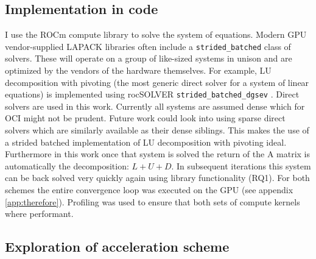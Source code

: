 \subsection{Implementation in code}

I use the ROCm compute library to solve the system of equations.
Modern GPU vendor-supplied LAPACK libraries often include a \texttt{strided\_batched} class of solvers.
These will operate on a group of like-sized systems in unison and are optimized by the vendors of the hardware themselves.
For example, LU decomposition with pivoting (the most generic direct solver for a system of linear equations) is implemented using rocSOLVER \texttt{strided\_batched\_dgsev} \cite{rocsolver}.
Direct solvers are used in this work.
Currently all systems are assumed dense which for OCI might not be prudent.
Future work could look into using sparse direct solvers which are similarly available as their dense siblings.
This makes the use of a strided batched implementation of LU decomposition with pivoting ideal.
Furthermore in this work once that system is solved the return of the A matrix is automatically the decomposition: $L+U+D$.
In subsequent iterations this system can be back solved very quickly again using library functionality (RQ1).
For both schemes the entire convergence loop was executed on the GPU (see appendix \ref{app:therefore}).
Profiling was used to ensure that both sets of compute kernels where performant.

\subsection{Exploration of acceleration scheme}
\label{ssec:method_acc}

